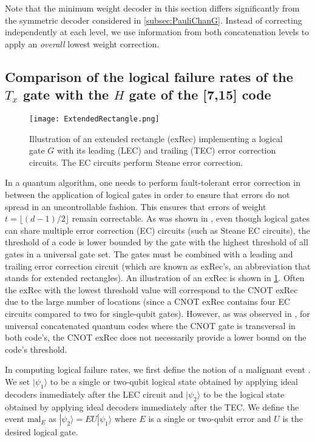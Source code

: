 \documentclass[pra,longbibliography,twocolumn,showpacs,nofootinbib,superscriptaddress,notitlepage]{revtex4-1}
\newcommand{\ket}[1]{|#1\rangle}  %
\begin{document}
Note that the minimum weight decoder in this section differs significantly from the symmetric decoder considered in \cref{subsec:PauliChanG}. Instead of correcting independently at each level, we use information from both concatenation levels to apply an \textit{overall} lowest weight correction.

\subsection{Comparison of the logical failure rates of the $T_{x}$ gate with the $H$ gate of the [7,15] code}
\label{subsec:LogicalFailureRates}

\begin{figure}
\centering
\texttt{[image: ExtendedRectangle.png]}
\caption{Illustration of an extended rectangle (exRec) implementing a logical gate $G$ with its leading (LEC) and trailing (TEC) error correction circuits. The EC circuits perform Steane error correction.}
\label{fig:ECcircuit}
\end{figure}

In a quantum algorithm, one needs to perform fault-tolerant error correction in between the application of logical gates in order to ensure that errors do not spread in an uncontrollable fashion. This ensures that errors of weight $t = \lfloor (d-1)/2 \rfloor$ remain correctable. As was shown in \cite{AGP06}, even though logical gates can share multiple error correction (EC) circuits (such as Steane EC circuits), the threshold of a code is lower bounded by the gate with the highest threshold of all gates in a universal gate set. The gates must be combined with a leading and trailing error correction circuit (which are known as exRec's, an abbreviation that stands for extended rectangles). An illustration of an exRec is shown in \cref{fig:ECcircuit}. Often the exRec with the lowest threshold value will correspond to the CNOT exRec due to the large number of locations (since a CNOT exRec contains four EC circuits compared to two for single-qubit gates). However, as was observed in \cite{CJL16}, for universal concatenated quantum codes where the CNOT gate is transversal in both code's, the CNOT exRec does not necessarily provide a lower bound on the code's threshold. 

In computing logical failure rates, we first define the notion of a malignant event \cite{PR12,CJL16,CJL16b}. We set $\ket{\psi_{1}}$ to be a single or two-qubit logical state obtained by applying ideal decoders immediately after the LEC circuit and $\ket{\psi_{2}}$ to be the logical state obtained by applying ideal decoders immediately after the TEC. We define the event $\mathrm{mal}_{E}$ as $\ket{\psi_{2}} = EU\ket{\psi_{1}}$ where $E$ is a single or two-qubit error and $U$ is the desired logical gate. 
\end{document}
